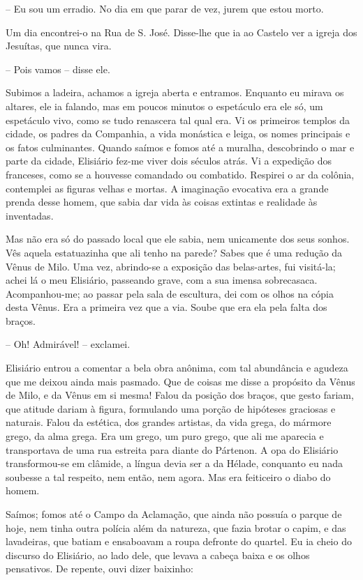 -- Eu sou um erradio. No dia em que parar de vez, jurem que estou morto.

Um dia encontrei-o na Rua de S. José. Disse-lhe que ia ao Castelo ver a
igreja dos Jesuítas, que nunca vira.

-- Pois vamos -- disse ele.

Subimos a ladeira, achamos a igreja aberta e entramos. Enquanto eu
mirava os altares, ele ia falando, mas em poucos minutos o espetáculo
era ele só, um espetáculo vivo, como se tudo renascera tal qual era. Vi
os primeiros templos da cidade, os padres da Companhia, a vida monástica
e leiga, os nomes principais e os fatos culminantes. Quando saímos e
fomos até a muralha, descobrindo o mar e parte da cidade, Elisiário
fez-me viver dois séculos atrás. Vi a expedição dos franceses, como se a
houvesse comandado ou combatido. Respirei o ar da colônia, contemplei as
figuras velhas e mortas. A imaginação evocativa era a grande prenda
desse homem, que sabia dar vida às coisas extintas e realidade às
inventadas.

Mas não era só do passado local que ele sabia, nem unicamente dos seus
sonhos. Vês aquela estatuazinha que ali tenho na parede? Sabes que é uma
redução da Vênus de Milo. Uma vez, abrindo-se a exposição das
belas-artes, fui visitá-la; achei lá o meu Elisiário, passeando grave,
com a sua imensa sobrecasaca. Acompanhou-me; ao passar pela sala de
escultura, dei com os olhos na cópia desta Vênus. Era a primeira vez que
a via. Soube que era ela pela falta dos braços.

-- Oh! Admirável! -- exclamei.

Elisiário entrou a comentar a bela obra anônima, com tal abundância e
agudeza que me deixou ainda mais pasmado. Que de coisas me disse a
propósito da Vênus de Milo, e da Vênus em si mesma! Falou da posição dos
braços, que gesto fariam, que atitude dariam à figura, formulando uma
porção de hipóteses graciosas e naturais. Falou da estética, dos grandes
artistas, da vida grega, do mármore grego, da alma grega. Era um grego,
um puro grego, que ali me aparecia e transportava de uma rua estreita
para diante do Pártenon. A opa do Elisiário transformou-se em clâmide, a
língua devia ser a da Hélade, conquanto eu nada soubesse a tal respeito,
nem então, nem agora. Mas era feiticeiro o diabo do homem.

Saímos; fomos até o Campo da Aclamação, que ainda não possuía o parque
de hoje, nem tinha outra polícia além da natureza, que fazia brotar o
capim, e das lavadeiras, que batiam e ensaboavam a roupa defronte do
quartel. Eu ia cheio do discurso do Elisiário, ao lado dele, que levava
a cabeça baixa e os olhos pensativos. De repente, ouvi dizer baixinho:

